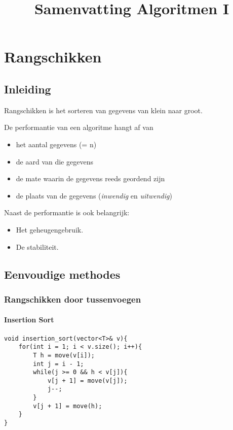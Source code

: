 \documentclass{report}
\title{Samenvatting Algoritmen I}
\author{}
\begin{document}
\maketitle
\tableofcontents

\part{Rangschikken}
\chapter{Inleiding}
Rangschikken is het sorteren van gegevens van klein naar groot.
    
De performantie van een algoritme hangt af van
\begin{itemize}
    \item het aantal gegevens (= n)
    \item de aard van die gegevens
    \item de mate waarin de gegevens reeds geordend zijn
    \item de plaats van de gegevens (\textit{inwendig} en \textit{uitwendig})
\end{itemize}
Naast de performantie is ook belangrijk:
\begin{itemize}
    \item Het geheugengebruik.
    \item De stabiliteit.
\end{itemize}
\chapter{Eenvoudige methodes}
\section{Rangschikken door tussenvoegen}
\subsection{Insertion Sort}
\begin{lstlisting}
void insertion_sort(vector<T>& v){
    for(int i = 1; i < v.size(); i++){
        T h = move(v[i]);
        int j = i - 1;
        while(j >= 0 && h < v[j]){
            v[j + 1] = move(v[j]);
            j--;
        }
        v[j + 1] = move(h);
    }
}
\end{lstlisting}
\end{document}
